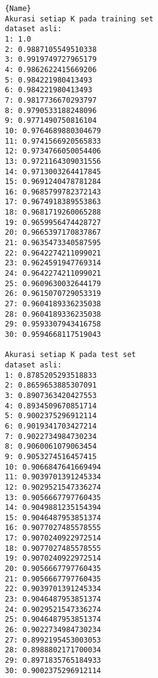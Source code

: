 \noindent\begin{minipage}{.48\textwidth}
\begin{lstlisting}[caption=Akurasi Dataset Asli,frame=tlrb, label=mobile_sensor_akurasi_asli]{Name}
Akurasi setiap K pada training set 
dataset asli: 
1: 1.0
2: 0.9887105549510338
3: 0.9919749727965179
4: 0.9862622415669206
5: 0.984221980413493
6: 0.984221980413493
7: 0.9817736670293797
8: 0.9790533188248096
9: 0.9771490750816104
10: 0.9764689880304679
11: 0.9741566920565833
12: 0.9734766050054406
13: 0.9721164309031556
14: 0.9713003264417845
15: 0.9691240478781284
16: 0.9685799782372143
17: 0.9674918389553863
18: 0.9681719260065288
19: 0.9659956474428727
20: 0.9665397170837867
21: 0.9635473340587595
22: 0.9642274211099021
23: 0.9624591947769314
24: 0.9642274211099021
25: 0.9609630032644179
26: 0.9615070729053319
27: 0.9604189336235038
28: 0.9604189336235038
29: 0.9593307943416758
30: 0.9594668117519043

Akurasi setiap K pada test set 
dataset asli: 
1: 0.8785205293518833
2: 0.8659653885307091
3: 0.8907363420427553
4: 0.8934509670851714
5: 0.9002375296912114
6: 0.9019341703427214
7: 0.9022734984730234
8: 0.9060061079063454
9: 0.9053274516457415
10: 0.9066847641669494
11: 0.9039701391245334
12: 0.9029521547336274
13: 0.9056667797760435
14: 0.9049881235154394
15: 0.9046487953851374
16: 0.9077027485578555
17: 0.9070240922972514
18: 0.9077027485578555
19: 0.9070240922972514
20: 0.9056667797760435
21: 0.9056667797760435
22: 0.9039701391245334
23: 0.9046487953851374
24: 0.9029521547336274
25: 0.9046487953851374
26: 0.9022734984730234
27: 0.8992195453003053
28: 0.8988802171700034
29: 0.8971835765184933
30: 0.9002375296912114
\end{lstlisting}
\end{minipage}\hfill

